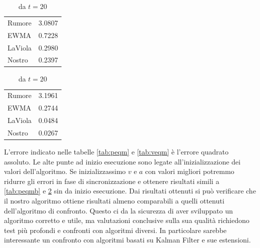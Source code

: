 \begin{table}
    \caption{Velocità: Errore quadrato medio}
    \label{tab:veqm}
    \centering
    \begin{subtable}{.49\textwidth}
        \caption{da $t=0$}
        \centering
        \begin{tabular}{l r}
            Rumore  & 3.0807 \\
            EWMA    & 0.7228 \\
            LaViola & 0.2980 \\
            Nostro  & 0.2397 \\
        \end{tabular}
    \end{subtable}
    \hfill
    \begin{subtable}{.49\textwidth}
        \caption{ da $t=20$ }
        \label{tab:veqmb}
        \centering
        \begin{tabular}{l r}
            Rumore  & 3.1961 \\
            EWMA    & 0.2744 \\
            LaViola & 0.0484 \\
            Nostro  & 0.0267 \\
        \end{tabular}
    \end{subtable}
\end{table}

L'errore indicato nelle tabelle \ref{tab:peqm} e \ref{tab:veqm} è l'errore quadrato assoluto.
Le alte punte ad inizio esecuzione sono legate all'inizializzazione dei valori dell'algoritmo.
Se inizializzassimo $v$ e $a$ con valori migliori potremmo ridurre gli errori in fase di sincronizzazione e ottenere risultati simili a \ref{tab:peqmb} e \ref{tab:veqmb} sin da inizio esecuzione.
Dai risultati ottenuti si può verificare che il nostro algoritmo ottiene risultati almeno comparabili a quelli ottenuti dell'algoritmo di confronto.
Questo ci da la sicurezza di aver sviluppato un algoritmo corretto e utile, ma valutazioni conclusive sulla sua qualità richiedono test più profondi e confronti con algoritmi diversi.
In particolare sarebbe interessante un confronto con algoritmi basati su Kalman Filter e sue estensioni. 
